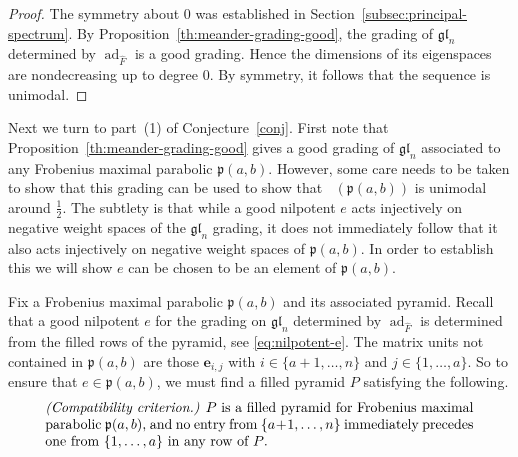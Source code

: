 \documentclass{amsart}
\def\be{\mathbf{e}}
\def\fp{\mathfrak p} %
\def\gl{\mathfrak{gl}}
\def\hatF{\widehat{F}}
\newcommand{\pab}[1][a,b]{\fp(#1)}
\def\gln{\gl_n}
\def\dimvec{\mathop{\underline{\mathrm{dim}}}}
\def\ad{\operatorname{ad}}
\theoremstyle{definition}
\begin{document}
\begin{proof}
The symmetry about $0$ was established in Section~\ref{subsec:principal-spectrum}.
By Proposition~\ref{th:meander-grading-good}, the grading of $\gln$
determined by $\ad_{\widehat F}$ is a good grading.
Hence the dimensions of its eigenspaces are nondecreasing up to degree $0$. By symmetry, it follows that the sequence is unimodal. 
\end{proof}
Next we turn to part~{\rm (1)} of Conjecture~\ref{conj}. First note that Proposition~\ref{th:meander-grading-good} gives a good grading of $\gln$ associated to any Frobenius maximal parabolic $\pab$. However, some care needs to be taken to show that this grading can be used to show that $\dimvec(\pab)$ is unimodal around $\frac12$. The subtlety is that while a good nilpotent $e$ acts injectively on negative weight spaces of the $\gln$ grading, it does not immediately follow that it also acts injectively on negative weight spaces of $\pab$. 
In order to establish this we will show $e$ can be chosen to be an element of $\pab$.

Fix a Frobenius maximal parabolic $\pab$ and its associated pyramid. Recall that a good nilpotent $e$ for the grading on $\gln$ determined by $\ad_{\hatF}$ is determined from the filled rows of the pyramid, see  \eqref{eq:nilpotent-e}. The matrix units not contained in $\pab$ are those $\be_{i,j}$ with $i\in \{a+1,\ldots, n\}$ and $j\in \{1, \ldots, a\}$. So to ensure that $e\in \pab$, we must find a filled pyramid $P$ satisfying the following.
\begin{gather}
\label{eq:compatibility-criteria}
\begin{tabular}{p{.89\textwidth}}
\emph{(Compatibility criterion.)} $P$ is a filled pyramid for Frobenius maximal parabolic $\pab$, and no entry from $\{a+1,\ldots, n\}$ immediately precedes one from $\{1, \ldots, a\}$ in any row of~$P$.
\end{tabular}
\end{gather}
\end{document}
